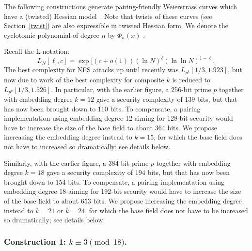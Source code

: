 The following constructions generate pairing-friendly Weierstrass curves
which have a (twisted) Hessian model~\cite[Section 5]{2015/hessian}.
Note that twists of these curves (see Section~\ref{twist}) are also expressible in twisted Hessian form.
We denote the cyclotomic polynomial of degree $n$ by $\Phi_{n}(x)$ .

Recall the L-notation:
\[L_N[\ell,c] = \exp [ (c + o(1))(\ln N)^{\ell}(\ln\ln N)^{1-\ell}.\]
The best complexity for NFS attacks up until recently was $L_{p^k}[1/3, 1.923]$, 
but now due to work of \cite{2016/KB} the best complexity for composite $k$ is reduced to
$L_{p^k}[1/3, 1.526]$.
In particular, with the earlier figure, a 256-bit prime $p$ together with embedding degree $k=12$ gave a security complexity of 139 bits, but that has now been brought down to 110 bits.
To compensate, a pairing implementation using embedding degree 12 aiming for 128-bit security would have to increase the size of the base field to about 364 bits. We propose increasing the embedding degree instead to $k=15$, for which the base field does not have to increased so dramatically; see details below.

Similarly, with the earlier figure, a 384-bit prime $p$ together with embedding degree $k=18$
gave a security complexity of 194 bits, but that has now been brought down to 154 bits. To compensate, a pairing implementation using embedding degree 18 aiming for 192-bit security would have to increase the size of the base field to about 653 bits. We propose increasing the embedding degree instead to $k=21$ or $k=24$, for which the base field does not have to be increased so dramatically; see details below.


\subsubsection{Construction 1: $k \equiv 3 \pmod{18}$.}
\label{con1}

